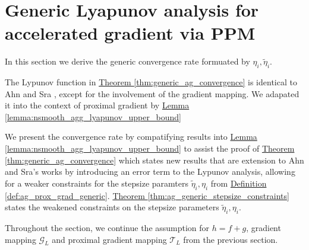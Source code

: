 \documentclass[12pt]{article}
\begin{document}
\section{Generic Lyapunov analysis for accelerated gradient via PPM}
\label{sec:generic_ag_ppm_lyapunov_analysis}
    In this section we derive the generic convergence rate formuated by $\eta_i, \tilde \eta_i$. 
    \par
    The Lypunov function in 
    \hyperref[thm:generic_ag_convergence]{Theorem \ref*{thm:generic_ag_convergence}}
    is identical to Ahn and Sra 
    \cite[section 4.2]{ahn_understanding_2022}, 
    except for the involvement of the gradient mapping. 
    We adapated it into the context of proximal gradient by 
    \hyperref[lemma:nsmooth_agg_lyapunov_upper_bound]
    {Lemma \ref*{lemma:nsmooth_agg_lyapunov_upper_bound}}
    \par
    We present the convergence rate by compatifying results into 
    \hyperref[lemma:nsmooth_agg_lyapunov_upper_bound]
    {Lemma \ref*{lemma:nsmooth_agg_lyapunov_upper_bound}} 
    to assist the proof of  
    \hyperref[thm:generic_ag_convergence]
    {Theorem \ref*{thm:generic_ag_convergence}} 
    which states new results that are extension to Ahn and Sra's works by introducing an error term to the Lypunov analysis, allowing for a weaker constraints for the stepsize paramters $\tilde \eta_i, \eta_i$ from 
    \hyperref[def:ag_prox_grad_generic]{Definition \ref*{def:ag_prox_grad_generic}}. 
    \hyperref[thm:ag_generic_stepsize_constraints]{Theorem \ref*{thm:ag_generic_stepsize_constraints}}
    states the weakened constraints on the stepsize parameters $\tilde \eta_i, \eta_i$. 
    \par
    Throughout the section, we continue the assumption for $h = f + g$, gradient mapping $\mathcal G_L$ and proximal gradient mapping $\mathcal T_L$ from the previous section. 
\end{document}
